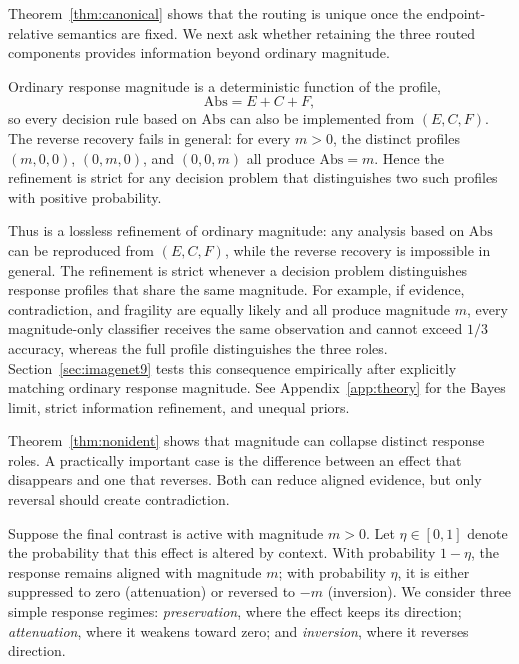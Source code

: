 Theorem~\ref{thm:canonical} shows that the routing is unique once the endpoint-relative semantics are fixed. We next ask whether retaining the three routed components provides information beyond ordinary magnitude.
\begin{theorem}
\label{thm:nonident}
Ordinary response magnitude is a deterministic function of the \decaf
profile,
\[
\mathrm{Abs}=E+C+F,
\]
so every decision rule based on $\mathrm{Abs}$ can also be implemented from
$(E,C,F)$. The reverse recovery fails in general: for every $m>0$, the
distinct profiles $(m,0,0)$, $(0,m,0)$, and $(0,0,m)$ all produce
$\mathrm{Abs}=m$. Hence the refinement is strict for any decision problem
that distinguishes two such profiles with positive probability.
\end{theorem}
Thus \decaf is a lossless refinement of ordinary magnitude: any analysis
based on $\mathrm{Abs}$ can be reproduced from $(E,C,F)$, while the reverse
recovery is impossible in general. The refinement is strict whenever a
decision problem distinguishes response profiles that share the same
magnitude. For example, if evidence, contradiction, and fragility are equally
likely and all produce magnitude $m$, every magnitude-only classifier receives
the same observation and cannot exceed $1/3$ accuracy, whereas the full
profile distinguishes the three roles. Section~\ref{sec:imagenet9} tests this consequence empirically after explicitly
matching ordinary response magnitude.
See Appendix~\ref{app:theory} for the Bayes limit, strict information refinement, and unequal priors.

Theorem~\ref{thm:nonident} shows that magnitude can collapse distinct response roles. A practically important case is the difference between an effect that disappears and one that reverses. Both can reduce aligned evidence, but only reversal should create contradiction.

Suppose the final contrast is active with magnitude $m>0$.
 Let $\eta\in[0,1]$ denote the probability that this effect is altered by context. With probability $1-\eta$, the response remains aligned with magnitude $m$; with probability $\eta$, it is either suppressed to zero (attenuation) or reversed to $-m$ (inversion). We consider three simple response regimes: \emph{preservation}, where the effect keeps its direction; \emph{attenuation}, where it weakens toward zero; and \emph{inversion}, where it reverses direction. 

